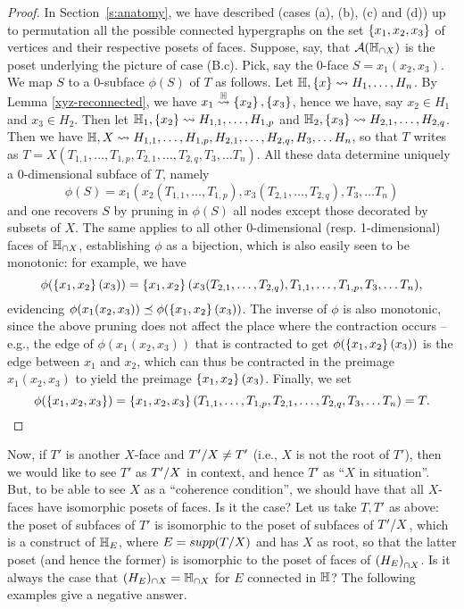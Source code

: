  \begin{proof}
 In Section~\ref{s:anatomy}, we have described (cases (a), (b), (c) and (d)) up to permutation all the possible connected hypergraphs on the set $\left\{x_1,x_2,x_3\right\}$ of vertices and their respective posets of faces. Suppose, say, that
  ${\cal A}({\mathbb H}_{\cap X})$ is the poset underlying the picture of case (B.c). Pick, say the 0-face $S= x_1(x_2,x_3)$. We map $S$ to a 0-subface $\phi(S)$ of $T$ as follows. Let ${\mathbb H},\left\{x\right\}\leadsto H_1,\ldots,H_n$. By Lemma \ref{xyz-reconnected}, we have $x_1\stackrel{{\mathbb H}}{\rightsquigarrow}\left\{x_2\right\},\left\{x_3\right\}$, hence we have, say $x_2\in H_1$ and $x_3\in H_2$. Then let
  ${\mathbb H_1},\left\{x_2\right\}\leadsto H_{1,1},\ldots,H_{1,p}$ and ${\mathbb H_2},\left\{x_3\right\}\leadsto H_{2,1},\ldots,H_{2,q}$.
  Then we have ${\mathbb H},X\leadsto H_{1,1},\ldots,H_{1,p},H_{2,1},\ldots,H_{2,q},H_3,\ldots H_n$, so that $T$ writes as
  $T= X(T_{1,1},\ldots,T_{1,p},T_{2,1},\ldots,T_{2,q},T_3,\ldots T_n)$. All these data determine uniquely a 0-dimensional subface of $T$, namely
  $$\phi(S)=x_1(x_2(T_{1,1},\ldots,T_{1,p}),x_3(T_{2,1},\ldots,T_{2,q}),T_3,\ldots T_n)$$
 and one recovers $S$
  by  pruning in $\phi(S)$ all nodes except those decorated by subsets of $X$.
  The same applies to all other 0-dimensional (resp. 1-dimensional) faces of ${\mathbb H}_{\cap X}$, establishing $\phi$ as a bijection, which is also easily seen to be monotonic: for example, we have
 $$\phi(\left\{x_1,x_2\right\}(x_3))= \left\{x_1,x_2\right\}(x_3(T_{2,1},\ldots,T_{2,q}),T_{1,1},\ldots,T_{1,p},T_3,\ldots T_n),$$
 evidencing $\phi(x_1(x_2,x_3))\preceq \phi(\left\{x_1,x_2\right\}(x_3))$. 
 The inverse of $\phi$ is also monotonic, since the above pruning does not affect the place where the contraction occurs -- e.g., the edge of $\phi(x_1(x_2,x_3))$ that is contracted to get $\phi(\left\{x_1,x_2\right\}(x_3))$ is the edge between $x_1$ and $x_2$, which can thus be contracted in the preimage $x_1(x_2,x_3)$ to yield the preimage $\left\{x_1,x_2\right\}(x_3)$.
 Finally, we set
 $$\phi(\left\{x_1,x_2,x_3\right\})=\left\{x_1,x_2,x_3\right\}(T_{1,1},\ldots,T_{1,p},T_{2,1},\ldots,T_{2,q},T_3,\ldots T_n)=T.$$
 \end{proof}

Now, if $T'$ is another $X$-face and $T'/X\neq T'$ (i.e., $X$ is not the root of $T'$), then we would like to see  $T'$ as $T'/X$ in context, and hence $T'$ as ``$X$ in situation''.  
But, to be able to see $X$ as a ``coherence condition'', we should have that all $X$-faces have isomorphic posets of faces.  
Is it the case?  
Let us take $T,T'$ as  above: the poset of subfaces of $T'$ is isomorphic  to the poset of subfaces of $T'/X$, which is a construct of ${\mathbb H}_E$, where $E={supp}(T/X)$ and has $X$ as root, so that the latter poset (and hence the former) is isomorphic to the poset of faces of ${\mathbb (H_E)}_{\cap X}$.
Is it always the case that ${\mathbb (H_E})_{\cap X}={\mathbb H}_{\cap X}$ for $E$ connected in ${\mathbb H}$? 
The following examples give a negative answer.

